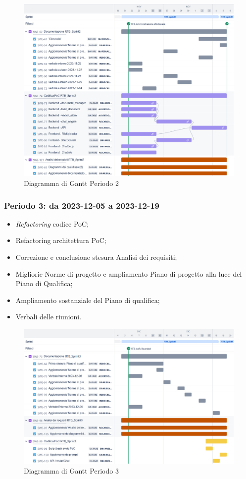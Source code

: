 \documentclass[10pt, a4paper]{article}
\begin{document}
 \begin{figure}[H]
        \centering        
        \includegraphics[width=15.5cm]{gantt/ganttPeriodo2.png}
        \caption{Diagramma di Gantt Periodo 2 }
    \end{figure}
\newpage
\subsubsection{Periodo 3: da 2023-12-05 a 2023-12-19}
\begin{itemize}
    \item \textit{Refactoring\pg} codice PoC;
    \item Refactoring architettura PoC;
    \item Correzione e conclusione stesura Analisi dei requisiti;
    \item Migliorie Norme di progetto e ampliamento Piano di progetto alla luce del Piano di Qualifica;
    \item Ampliamento sostanziale del Piano di qualifica;
    \item Verbali delle riunioni.
\end{itemize}
\begin{figure}[H]
    \centering        
    \includegraphics[width=15.5cm]{gantt/ganttPeriodo3.png}
    \caption{Diagramma di Gantt Periodo 3 }
\end{figure}
\newpage
\end{document}
